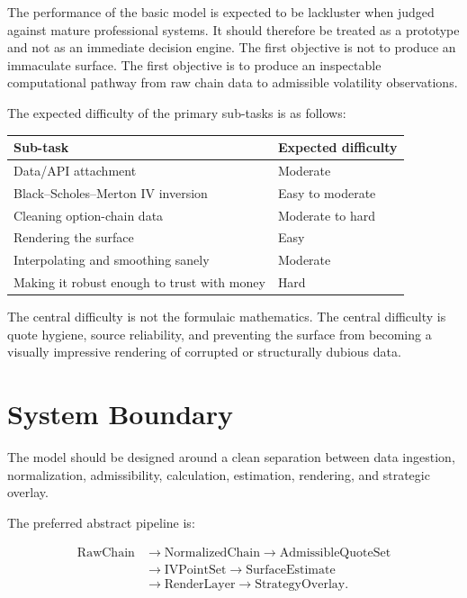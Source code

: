 \documentclass[11pt]{article}
\begin{document}
The performance of the basic model is expected to be lackluster when judged against mature professional systems. It should therefore be treated as a prototype and not as an immediate decision engine. The first objective is not to produce an immaculate surface. The first objective is to produce an inspectable computational pathway from raw chain data to admissible volatility observations.

The expected difficulty of the primary sub-tasks is as follows:

\begin{center}
\begin{tabular}{ll}
\toprule
\textbf{Sub-task} & \textbf{Expected difficulty} \\
\midrule
Data/API attachment & Moderate \\
Black--Scholes--Merton IV inversion & Easy to moderate \\
Cleaning option-chain data & Moderate to hard \\
Rendering the surface & Easy \\
Interpolating and smoothing sanely & Moderate \\
Making it robust enough to trust with money & Hard \\
\bottomrule
\end{tabular}
\end{center}

The central difficulty is not the formulaic mathematics. The central difficulty is quote hygiene, source reliability, and preventing the surface from becoming a visually impressive rendering of corrupted or structurally dubious data.

\section{System Boundary}

The model should be designed around a clean separation between data ingestion, normalization, admissibility, calculation, estimation, rendering, and strategic overlay.

The preferred abstract pipeline is:

\[
\begin{aligned}
\text{RawChain} &\rightarrow \text{NormalizedChain} \rightarrow \text{AdmissibleQuoteSet} \\
&\rightarrow \text{IVPointSet} \rightarrow \text{SurfaceEstimate} \\
&\rightarrow \text{RenderLayer} \rightarrow \text{StrategyOverlay}.
\end{aligned}
\]
\end{document}
